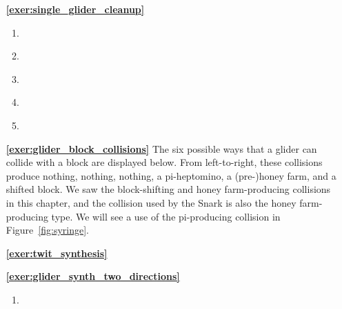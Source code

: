 \begin{multicols}{2}
	\begin{itemize}[leftmargin=0em]
		\item[\bf\color{ocre}\sffamily\ref{exer:single_glider_cleanup}]
		\begin{enumerate}[leftmargin=1.5em,label=\bf\color{ocre}(\alph*)]
			\item {} \\
			
			\item {} \\
			
			\item {} \\
			
			\item {} \\
			
			\item {} \\
		\end{enumerate}
		
		
		\item[\bf\color{ocre}\sffamily\ref{exer:glider_block_collisions}] The six possible ways that a glider can collide with a block are displayed below. From left-to-right, these collisions produce nothing, nothing, nothing, a pi-heptomino, a (pre-)honey farm, and a shifted block. We saw the block-shifting and honey farm-producing collisions in this chapter, and the collision used by the Snark is also the honey farm-producing type. We will see a use of the pi-producing collision in Figure~\ref{fig:syringe}.
		\begin{center}
		\end{center}
		
		
		\item[\bf\color{ocre}\sffamily\ref{exer:twit_synthesis}]  \\
		
		
		\item[\bf\color{ocre}\sffamily\ref{exer:glider_synth_two_directions}]
		\begin{enumerate}[leftmargin=1.5em,label=\bf\color{ocre}(\alph*)]
			\item {} \\
			

\end{enumerate}
\end{itemize}
\end{multicols}
